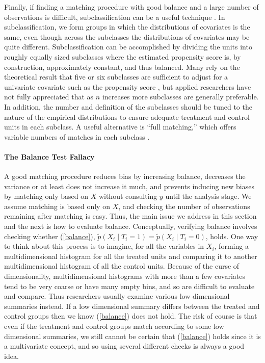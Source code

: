\documentclass[11pt,titlepage]{article}
\begin{document}
Finally, if finding a matching procedure with good balance and a large
number of observations is difficult, subclassification can be a useful
technique \citep{ImaDyk04}.  In subclassification, we form groups in
which the distributions of covariates is the same, even though across
the subclasses the distributions of covariates may be quite different.
Subclassification can be accomplished by dividing the units into
roughly equally sized subclasses where the estimated propensity score
is, by construction, approximately constant, and thus balanced.  Many
rely on the theoretical result that five or six subclasses are
sufficient to adjust for a univariate covariate such as the propensity
score \citep{Cochran68,RosRub84}, but applied researchers have not
fully appreciated that as $n$ increases more subclasses are generally
preferable.  In addition, the number and definition of the subclasses
should be tuned to the nature of the empirical distributions to ensure
adequate treatment and control units in each subclass.  A useful
alternative is ``full matching,'' which offers variable numbers
of matches in each subclass \citep{Hansen04}.

\paragraph{The Balance Test Fallacy}

A good matching procedure reduces bias by increasing balance,
decreases the variance or at least does not increase it much, and
prevents inducing new biases by matching only based on $X$ without
consulting $y$ until the analysis stage.  We assume matching is based
only on $X$, and checking the number of observations remaining after
matching is easy.  Thus, the main issue we address in this section and
the next is how to evaluate balance.  Conceptually, verifying balance
involves checking whether (\ref{balance}), $\tilde p(X_i \mid
T_i=1)=\tilde p(X_i\mid T_i=0)$, holds.  One way to think about this
process is to imagine, for all the variables in $X_i$, forming a
multidimensional histogram for all the treated units and comparing it
to another multidimensional histogram of all the control units.
Because of the curse of dimensionality, multidimensional histograms
with more than a few covariates tend to be very coarse or have many
empty bins, and so are difficult to evaluate and compare.  Thus
researchers usually examine various low dimensional summaries instead.
If a low dimensional summary differs between the treated and control
groups then we know (\ref{balance}) does not hold.  The risk of course
is that even if the treatment and control groups match according to
some low dimensional summaries, we still cannot be certain that
(\ref{balance}) holds since it is a multivariate concept, and so using
several different checks is always a good idea.
\end{document}

